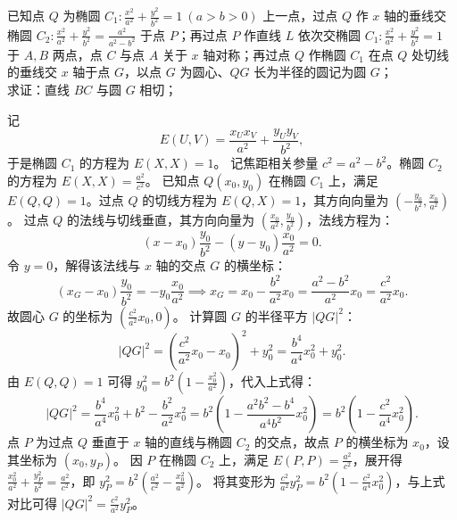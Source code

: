 \begin{example}
已知点 \(Q\) 为椭圆 \(C_1: \frac{x^2}{a^2} + \frac{y^2}{b^2} = 1\ (a > b > 0)\) 上一点，过点 \(Q\) 作 \(x\) 轴的垂线交椭圆 \(C_2: \frac{x^2}{a^2} + \frac{y^2}{b^2} = \frac{a^2}{a^2 - b^2}\) 于点 \(P\)；再过点 \(P\) 作直线 \(L\) 依次交椭圆 \(C_1: \frac{x^2}{a^2} + \frac{y^2}{b^2} = 1\) 于 \(A,B\) 两点，点 \(C\) 与点 \(A\) 关于 \(x\) 轴对称；再过点 \(Q\) 作椭圆 \(C_1\) 在点 \(Q\) 处切线的垂线交 \(x\) 轴于点 \(G\)，以点 \(G\) 为圆心、\(QG\) 长为半径的圆记为圆 \(G\)；\\
求证：直线 \(BC\) 与圆 \(G\) 相切；
\end{example}
\begin{solution}
记
\[ E(U, V) = \frac{x_U x_V}{a^2} + \frac{y_U y_V}{b^2}, \]
于是椭圆 $C_1$ 的方程为 $E(X, X) = 1$。
记焦距相关参量 $c^2 = a^2 - b^2$。椭圆 $C_2$ 的方程为 $E(X, X) = \frac{a^2}{c^2}$。
已知点 $Q(x_0, y_0)$ 在椭圆 $C_1$ 上，满足 $E(Q, Q) = 1$。过点 $Q$ 的切线方程为 $E(Q, X) = 1$，其方向向量为 $\left(-\frac{y_0}{b^2}, \frac{x_0}{a^2}\right)$。
过点 $Q$ 的法线与切线垂直，其方向向量为 $\left(\frac{x_0}{a^2}, \frac{y_0}{b^2}\right)$，法线方程为：
\[
(x - x_0) \frac{y_0}{b^2} - (y - y_0) \frac{x_0}{a^2} = 0.
\]
令 $y = 0$，解得该法线与 $x$ 轴的交点 $G$ 的横坐标：
\[
(x_G - x_0) \frac{y_0}{b^2} = -y_0 \frac{x_0}{a^2} \implies x_G = x_0 - \frac{b^2}{a^2} x_0 = \frac{a^2 - b^2}{a^2} x_0 = \frac{c^2}{a^2} x_0.
\]
故圆心 $G$ 的坐标为 $\left(\frac{c^2}{a^2} x_0, 0\right)$。
计算圆 $G$ 的半径平方 $|QG|^2$：
\[
|QG|^2 = \left( \frac{c^2}{a^2} x_0 - x_0 \right)^2 + y_0^2 = \frac{b^4}{a^4} x_0^2 + y_0^2.
\]
由 $E(Q, Q) = 1$ 可得 $y_0^2 = b^2 \left( 1 - \frac{x_0^2}{a^2} \right)$，代入上式得：
\[
|QG|^2 = \frac{b^4}{a^4} x_0^2 + b^2 - \frac{b^2}{a^2} x_0^2 = b^2 \left( 1 - \frac{a^2 b^2 - b^4}{a^4 b^2} x_0^2 \right) = b^2 \left( 1 - \frac{c^2}{a^4} x_0^2 \right).
\]
点 $P$ 为过点 $Q$ 垂直于 $x$ 轴的直线与椭圆 $C_2$ 的交点，故点 $P$ 的横坐标为 $x_0$，设其坐标为 $(x_0, y_P)$。
因 $P$ 在椭圆 $C_2$ 上，满足 $E(P, P) = \frac{a^2}{c^2}$，展开得 $\frac{x_0^2}{a^2} + \frac{y_P^2}{b^2} = \frac{a^2}{c^2}$，即 $y_P^2 = b^2 \left( \frac{a^2}{c^2} - \frac{x_0^2}{a^2} \right)$。
将其变形为 $\frac{c^2}{a^2} y_P^2 = b^2 \left( 1 - \frac{c^2}{a^4} x_0^2 \right)$，与上式对比可得 $|QG|^2 = \frac{c^2}{a^2} y_P^2$。


\end{solution}
